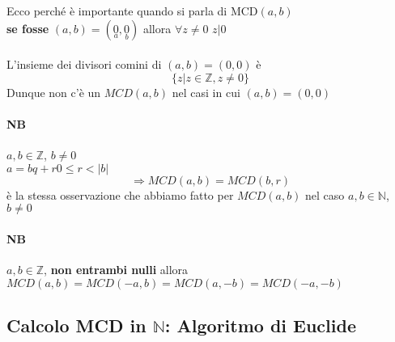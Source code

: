     Ecco perché è importante quando si parla di MCD$(a,b)$\\
    \textbf{se fosse} $(a,b)=(\underset{a}{0},\underset{b}{0})$ allora $\forall z\neq 0$ $z|0$\\\\
    L'insieme dei divisori comini di $(a,b)=(0,0)$ è
    $$\{z|z\in\mathbb{Z},z\neq0\}$$
    Dunque non c'è un $MCD(a,b)$ nel casi in cui $(a,b)=(0,0)$
    \paragraph{NB} $a,b\in\mathbb{Z}$, $b\neq 0$\\
    $a=bq+r$\hspace{1cm}$0\leq r<|b|$
    $$\Longrightarrow MCD(a,b)=MCD(b,r)$$
    è la stessa osservazione che abbiamo fatto per $MCD(a,b)$ nel caso $a,b\in\mathbb{N}$, $b\neq 0$
    \paragraph{NB} $a,b\in\mathbb{Z}$, \textbf{non entrambi nulli} allora\\
    $MCD(a,b)=MCD(-a,b)=MCD(a,-b)=MCD(-a,-b)$
    \subsection{Calcolo MCD in $\mathbb{N}$: Algoritmo di Euclide }

